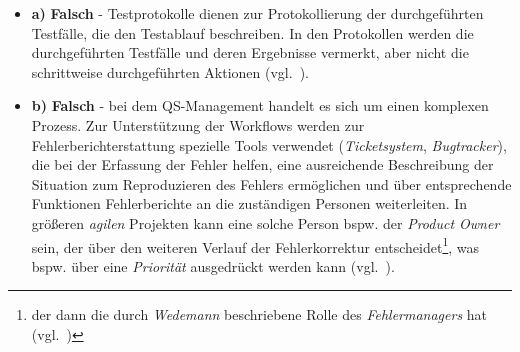 


\begin{itemize}
    \item \textbf{a)} \textbf{Falsch} - Testprotokolle dienen zur Protokollierung der durchgeführten Testfälle, die den Testablauf beschreiben.
    In den Protokollen werden die durchgeführten Testfälle und deren Ergebnisse vermerkt, aber nicht die schrittweise durchgeführten Aktionen (vgl.~\cite[73]{Wed09c}).
    \item \textbf{b)} \textbf{Falsch} - bei dem QS-Management handelt es sich um einen komplexen Prozess.
Zur Unterstützung der Workflows werden zur Fehlerberichterstattung  spezielle Tools verwendet (\textit{Ticketsystem}, \textit{Bugtracker}), die bei der Erfassung der Fehler helfen, eine ausreichende Beschreibung der Situation zum Reproduzieren des Fehlers ermöglichen und über entsprechende Funktionen Fehlerberichte an die zuständigen Personen weiterleiten.
In größeren \textit{agilen} Projekten kann eine solche Person bspw. der \textit{Product Owner} sein, der über den weiteren Verlauf der Fehlerkorrektur entscheidet\footnote{
    der dann die durch \textit{Wedemann} beschriebene Rolle des \textit{Fehlermanagers} hat (vgl.~\cite[75]{Wed09c})
}, was bspw. über eine \textit{Priorität} ausgedrückt werden kann (vgl.~\cite[108]{Pic08}).

\end{itemize}